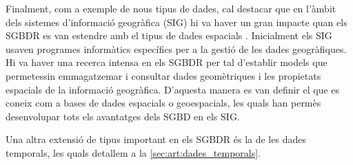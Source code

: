 











Finalment, com a exemple de nous tipus de dades, cal destacar que en
l'àmbit dels sistemes d’informació geogràfica (SIG) hi va haver un
gran impacte quan els SGBDR es van estendre amb el tipus de dades
espacials \parencite{nunes13:icc_geospacial}.  Inicialment els SIG
usaven programes informàtics específics per a la gestió de les dades
geogràfiques. Hi va haver una recerca intensa en els SGBDR per tal
d'establir models que permetessin emmagatzemar i consultar dades
geomètriques i les propietats espacials de la informació
geogràfica. D'aquesta manera es van definir el que es coneix com a
bases de dades espacials o geoespacials, les quals han permès
desenvolupar tots els avantatges dels SGBD en els SIG. %

Una altra extensió de tipus important en els SGBDR és la de les dades
temporals, les quals detallem a la \autoref{sec:art:dades_temporals}.






